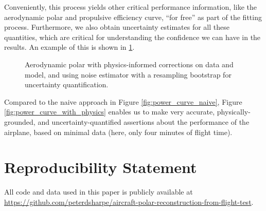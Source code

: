 \documentclass[conf]{new-aiaa}
\begin{document}
    Conveniently, this process yields other critical performance information, like the aerodynamic polar and propulsive efficiency curve, ``for free'' as part of the fitting process. Furthermore, we also obtain uncertainty estimates for all these quantities, which are critical for understanding the confidence we can have in the results. An example of this is shown in \ref{fig:aerodynamic_polar_with_physics}.

    \begin{figure}[!htb]
        \centering
        \caption{Aerodynamic polar with physics-informed corrections on data and model, and using noise estimator with a resampling bootstrap for uncertainty quantification.}
        \label{fig:aerodynamic_polar_with_physics}
    \end{figure}

    Compared to the naive approach in Figure \ref{fig:power_curve_naive}, Figure \ref{fig:power_curve_with_physics} enables us to make very accurate, physically-grounded, and uncertainty-quantified assertions about the performance of the airplane, based on minimal data (here, only four minutes of flight time).


    \section{Reproducibility Statement}

    All code and data used in this paper is publicly available at \url{https://github.com/peterdsharpe/aircraft-polar-reconstruction-from-flight-test}.
\end{document}
